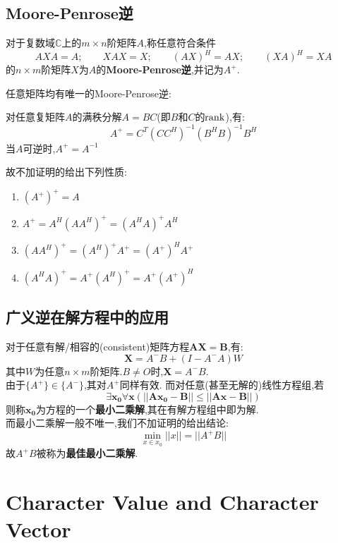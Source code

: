 \documentclass[UTF8,a4paper,notitlepage]{book}
\begin{document}
        \subsection{Moore-Penrose逆}
        \begin{definition}
            对于复数域$\mathbb{C}$上的$m\times n$阶矩阵$A$,称任意符合条件
            $$AXA=A;\qquad XAX=X;\qquad (AX)^H=AX;\qquad (XA)^H=XA$$
            的$n\times m$阶矩阵$X$为$A$的\textbf{Moore-Penrose逆},并记为$A^+$.
        \end{definition}
        任意矩阵均有唯一的Moore-Penrose逆:
        \begin{theorem}
            对任意复矩阵$A$的满秩分解$A=BC$(即$B$和$C$的$\operatorname{rank}$),有:
            $$A^+=C^T(CC^H)^{-1}(B^HB)^{-1}B^H$$
            当$A$可逆时,$A^+=A^{-1}$
        \end{theorem}
        故不加证明的给出下列性质:
        \begin{corollary}\mbox{}
            \begin{enumerate}
                \item $(A^+)^+=A$
                \item $A^+=A^H(AA^H)^+=(A^HA)^+A^H$
                \item $(AA^H)^+=(A^H)^+A^+=(A^+)^HA^+$
                \item $(A^HA)^+=A^+(A^H)^+=A^+(A^+)^H$
            \end{enumerate}
        \end{corollary}
        \subsection{广义逆在解方程中的应用}
        对于任意有解/相容的(consistent)矩阵方程$\mathbf{AX=B}$,有:
        $$\mathbf{X}=A^-B+(I-A^-A)W$$
        其中$W$为任意$n\times m$阶矩阵.$B\neq O$时,$\mathbf{X}=A^-B$.\\
        由于$\{A^+\}\in \{A^-\}$,其对$A^+$同样有效.
        而对任意(甚至无解的)线性方程组,若$$\exists \mathbf{x_0}\forall \mathbf{x(||Ax_0-B||\leq ||Ax-B||)}$$
        则称$\mathbf{x_0}$为方程的一个\textbf{最小二乘解},其在有解方程组中即为解.\\ 
        而最小二乘解一般不唯一,我们不加证明的给出结论:
        $$\min_{x\in x_0}{||x||}=||A^+B||$$
        故$A^+B$被称为\textbf{最佳最小二乘解}.
        \section{Character Value and Character Vector}
\end{document}
